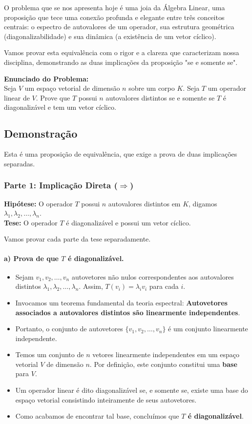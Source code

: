 O problema que se nos apresenta hoje é uma joia da Álgebra Linear, uma proposição que tece uma
conexão profunda e elegante entre três conceitos centrais: o espectro de autovalores de um
operador, sua estrutura geométrica (diagonalizabilidade) e sua dinâmica (a existência de um vetor
cíclico).

Vamos provar esta equivalência com o rigor e a clareza que caracterizam nossa disciplina,
demonstrando as duas implicações da proposição "se e somente se".

\textbf{Enunciado do Problema:} \\
Seja $V$ um espaço vetorial de dimensão $n$ sobre um corpo $K$. Seja $T$ um operador linear de $V$.
Prove que $T$ possui $n$ autovalores distintos se e somente se $T$ é diagonalizável e tem um vetor cíclico.

\subsection*{Demonstração}

Esta é uma proposição de equivalência, que exige a prova de duas implicações separadas.

\subsubsection*{Parte 1: Implicação Direta ($\Rightarrow$)}

\textbf{Hipótese:} O operador $T$ possui $n$ autovalores distintos em $K$, digamos
$\lambda_1, \lambda_2, \ldots, \lambda_n$. \\

\textbf{Tese:} O operador $T$ é diagonalizável e possui um vetor cíclico.

Vamos provar cada parte da tese separadamente.

\paragraph{a) Prova de que $T$ é diagonalizável.}
\begin{itemize}
    \item Sejam $v_1, v_2, \ldots, v_n$ autovetores não nulos correspondentes aos autovalores distintos
    $\lambda_1, \lambda_2, \ldots, \lambda_n$. Assim, $T(v_i) = \lambda_i v_i$ para cada $i$.
    \item Invocamos um teorema fundamental da teoria espectral: \textbf{Autovetores associados a
    autovalores distintos são linearmente independentes}.
    \item Portanto, o conjunto de autovetores $\{v_1, v_2, \ldots, v_n\}$ é um conjunto linearmente
    independente.
    \item Temos um conjunto de $n$ vetores linearmente independentes em um espaço vetorial $V$ de
    dimensão $n$. Por definição, este conjunto constitui uma \textbf{base} para $V$.
    \item Um operador linear é dito diagonalizável se, e somente se, existe uma base do espaço vetorial
    consistindo inteiramente de seus autovetores.
    \item Como acabamos de encontrar tal base, concluímos que \textbf{$T$ é diagonalizável}.
\end{itemize}

